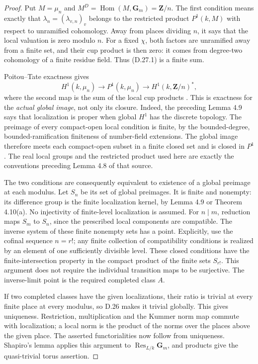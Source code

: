 \begin{proof}
Put $M=\mu_n$ and $M^D=\operatorname{Hom}(M,\mathbf G_m)
=\mathbf Z/n$. The first condition means exactly that
$\lambda_n=(\lambda_{v,n})_v$ belongs to the restricted
product $P^1(k,M)$ with respect to unramified cohomology.
Away from places dividing $n$, it says that the local
valuation is zero modulo $n$. For a fixed $\chi$, both
factors are unramified away from a finite set, and their
cup product is then zero: it comes from degree-two
cohomology of a finite residue field. Thus (D.27.1) is a
finite sum.

Poitou--Tate exactness gives
\[
 H^1(k,\mu_n)\longrightarrow P^1(k,\mu_n)
       \longrightarrow H^1(k,\mathbf Z/n)^*,              \tag{D.27.3}
\]
where the second map is the sum of the local cup products
\cite[I, \S4, Theorem 4.10(b)]{D_MilneADT2006}.
This is exactness for the \emph{actual global image}, not
only its closure. Indeed, the preceding Lemma 4.9 says that
localization is proper when global $H^1$ has the discrete
topology. The preimage of every compact-open local condition
is finite, by the bounded-degree, bounded-ramification
finiteness of number-field extensions. The global image
therefore meets each compact-open subset in a finite closed
set and is closed in $P^1$. The real local groups and the
restricted product used here are exactly the conventions
preceding Lemma 4.8 of that source.

The two conditions are consequently equivalent to existence
of a global preimage at each modulus. Let $S_n$ be its set
of global preimages. It is finite and nonempty: its difference
group is the finite localization kernel, by Lemma 4.9 or
Theorem 4.10(a). No injectivity of finite-level localization
is assumed. For $n\mid m$, reduction maps $S_m$ to $S_n$,
since the prescribed local components are compatible.
The inverse system of these finite nonempty sets has a
point. Explicitly, use the cofinal sequence $n=r!$;
any finite collection of compatibility conditions is realized
by an element of one sufficiently divisible level. These
closed conditions have the finite-intersection property in
the compact product of the finite sets $S_{r!}$.
This argument does not require the individual transition
maps to be surjective. The inverse-limit point is the
required completed class $A$.

If two completed classes have the given localizations,
their ratio is trivial at every finite place at every
modulus, so D.26 makes it trivial globally. This gives
uniqueness. Restriction, multiplication and the Kummer norm
map commute with localization; a local norm is the product
of the norms over the places above the given place.
The asserted functorialities now follow from uniqueness.
Shapiro's lemma applies this argument to
$\operatorname{Res}_{L/k}\mathbf G_m$, and products give
the quasi-trivial torus assertion.


\end{proof}
